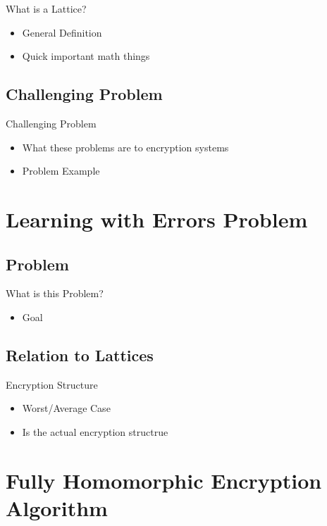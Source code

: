 \documentclass{beamer}
\begin{document}
\begin{frame}{What is a Lattice?}
    \begin{itemize}
    \item General Definition
    \item Quick important math things
    \end{itemize}
\end{frame}

\subsection{Challenging Problem}

\begin{frame}{Challenging Problem}
    \begin{itemize}
    \item What these problems are to encryption systems
    \item Problem Example
    \end{itemize}
\end{frame}

\section{Learning with Errors Problem} %
\subsection{Problem}

\begin{frame}{What is this Problem?}
    \begin{itemize}
    \item Goal
    \end{itemize}
\end{frame}

\subsection{Relation to Lattices}
\begin{frame}{Encryption Structure}
    \begin{itemize}
    \item Worst/Average Case
    \item Is the actual encryption structrue
    \end{itemize}
\end{frame}

\section{Fully Homomorphic Encryption Algorithm}
\end{document}
